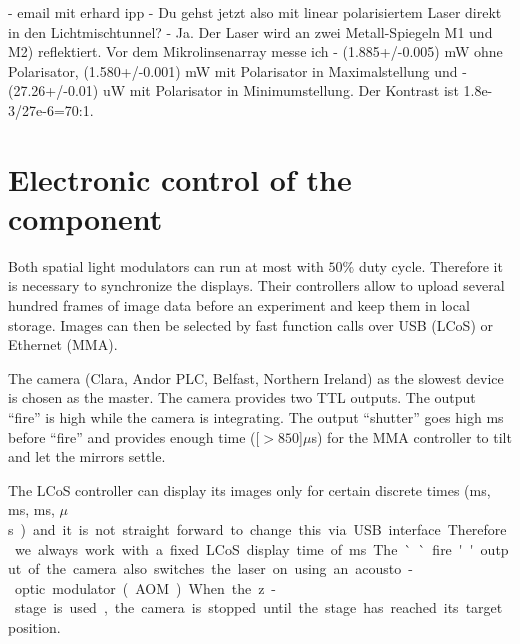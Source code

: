  - email mit erhard ipp
  - Du gehst jetzt also mit linear polarisiertem Laser direkt in den Lichtmischtunnel?
  - Ja. Der Laser wird an zwei Metall-Spiegeln M1 und M2)
     reflektiert. Vor dem Mikrolinsenarray messe ich
   - (1.885+/-0.005) mW ohne Polarisator, (1.580+/-0.001) mW mit
     Polarisator in Maximalstellung und
   - (27.26+/-0.01) uW mit Polarisator in Minimumstellung.  Der
     Kontrast ist 1.8e-3/27e-6=70:1.


\section{Electronic control of the component}

Both spatial light modulators can run at most with $50\%$ duty
cycle. Therefore it is necessary to synchronize the displays. Their
controllers allow to upload several hundred frames of image data
before an experiment and keep them in local storage. Images can then
be selected by fast function calls over USB (LCoS) or Ethernet (MMA).

The camera (Clara, Andor PLC, Belfast, Northern Ireland) as the
slowest device is chosen as the master. The camera provides two TTL
outputs. The output ``fire'' is high while the camera is
integrating. The output ``shutter'' goes high \unit[1]{ms} before
``fire'' and provides enough time (\unit[$>850$]{$\mu$s}) for the MMA
controller to tilt and let the mirrors settle.

The LCoS controller can display its images only for certain discrete
times (\unit[20]{ms}, \unit[10]{ms}, \unit[5]{ms}, \unit[200]{$\mu$s})
and it is not straight forward to change this via USB
interface. Therefore we always work with a fixed LCoS display time of
\unit[20]{ms}. The ``fire'' output of the camera also switches the
laser on using an acousto-optic modulator (AOM).

When the z-stage is used, the camera is stopped until the stage has
reached its target position.









